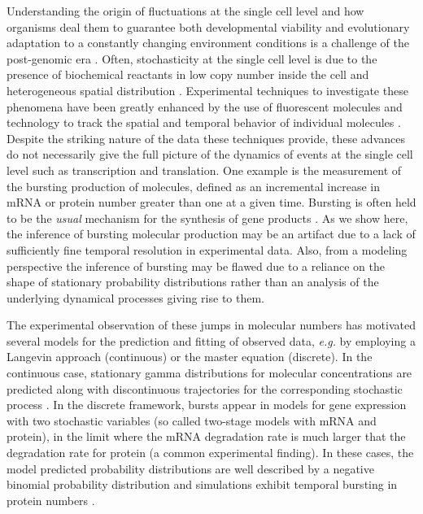 \maketitle 

Understanding the origin of fluctuations at the single cell level and
how organisms deal them to guarantee both developmental viability and
evolutionary adaptation to a constantly changing environment
conditions is a challenge of the post-genomic era \cite{Kaern2005,
  Raser2005}.  Often, stochasticity at the single cell level is due to
the presence of biochemical reactants in low copy number inside the
cell \cite{delbruck40} and heterogeneous spatial distribution
\cite{Kuthan2001}.  Experimental techniques to investigate these
phenomena have been greatly enhanced by the use of fluorescent
molecules and technology to track the spatial and temporal behavior of
individual molecules \cite{Xie2008, Raj2009}.  Despite the striking
nature of the data these techniques provide, these advances do not
necessarily give the full picture of the dynamics of events at the
single cell level such as transcription and translation.  One example
is the measurement of the bursting production of molecules, defined as
an incremental increase in mRNA or protein number greater than one at
a given time.  Bursting is often held to be the {\it usual} mechanism
for the synthesis of gene products \cite{Xie2008, Raj2009}. As we show
here, the inference of bursting molecular production may be an
artifact due to a lack of sufficiently fine temporal resolution in
experimental data.  Also, from a modeling perspective the inference of
bursting may be flawed due to a reliance on the shape of stationary
probability distributions rather than an analysis of the underlying
dynamical processes giving rise to them.

The experimental observation of these jumps in molecular numbers has
motivated several models for the prediction and fitting of observed
data, {\em e.g.} by employing a Langevin approach (continuous) or the
master equation (discrete).  In the continuous case, stationary gamma
distributions for molecular concentrations are predicted along with
discontinuous trajectories for the corresponding stochastic process
\cite{Friedman2006, Mackey2011}.  In the discrete framework, bursts
appear in models for gene expression with two stochastic variables (so
called two-stage models with mRNA and protein), in the limit where the
mRNA degradation rate is much larger that the degradation rate for
protein (a common experimental finding).  In these cases, the model
predicted probability distributions are well described by a negative
binomial probability distribution \cite{Shahrezaei2008} and
simulations exhibit temporal bursting in protein numbers
\cite{Raj2009}.

